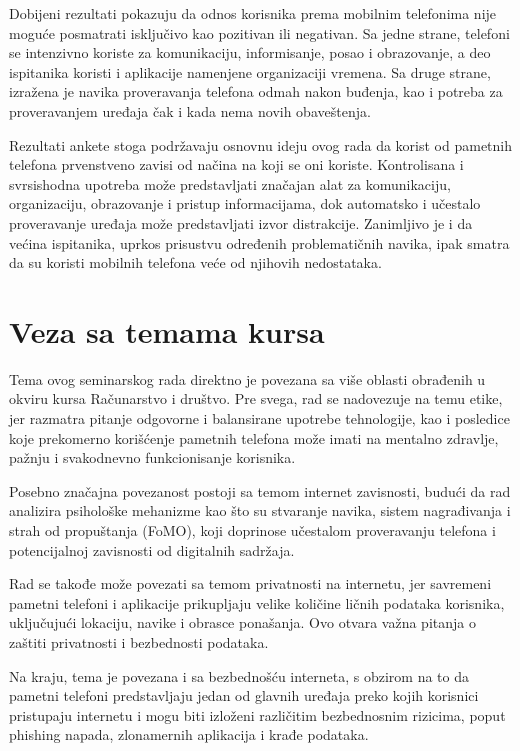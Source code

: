 \documentclass{article}
\begin{document}
Dobijeni rezultati pokazuju da odnos korisnika prema mobilnim telefonima nije moguće posmatrati isključivo kao pozitivan ili negativan. Sa jedne strane, telefoni se intenzivno koriste za komunikaciju, informisanje, posao i obrazovanje, a deo ispitanika koristi i aplikacije namenjene organizaciji vremena. Sa druge strane, izražena je navika proveravanja telefona odmah nakon buđenja, kao i potreba za proveravanjem uređaja čak i kada nema novih obaveštenja.

Rezultati ankete stoga podržavaju osnovnu ideju ovog rada da korist od pametnih telefona prvenstveno zavisi od načina na koji se oni koriste. Kontrolisana i svrsishodna upotreba može predstavljati značajan alat za komunikaciju, organizaciju, obrazovanje i pristup informacijama, dok automatsko i učestalo proveravanje uređaja može predstavljati izvor distrakcije. Zanimljivo je i da većina ispitanika, uprkos prisustvu određenih problematičnih navika, ipak smatra da su koristi mobilnih telefona veće od njihovih nedostataka.



\newpage 
\section{Veza sa temama kursa}

Tema ovog seminarskog rada direktno je povezana sa više oblasti obrađenih u okviru kursa Računarstvo i društvo. Pre svega, rad se nadovezuje na temu etike, jer razmatra pitanje odgovorne i balansirane upotrebe tehnologije, kao i posledice koje prekomerno korišćenje pametnih telefona može imati na mentalno zdravlje, pažnju i svakodnevno funkcionisanje korisnika.

Posebno značajna povezanost postoji sa temom internet zavisnosti, budući da rad analizira psihološke mehanizme kao što su stvaranje navika, sistem nagrađivanja i strah od propuštanja (FoMO), koji doprinose učestalom proveravanju telefona i potencijalnoj zavisnosti od digitalnih sadržaja.

Rad se takođe može povezati sa temom privatnosti na internetu, jer savremeni pametni telefoni i aplikacije prikupljaju velike količine ličnih podataka korisnika, uključujući lokaciju, navike i obrasce ponašanja. Ovo otvara važna pitanja o zaštiti privatnosti i bezbednosti podataka.

Na kraju, tema je povezana i sa bezbednošću interneta, s obzirom na to da pametni telefoni predstavljaju jedan od glavnih uređaja preko kojih korisnici pristupaju internetu i mogu biti izloženi različitim bezbednosnim rizicima, poput phishing napada, zlonamernih aplikacija i krađe podataka.
\end{document}
